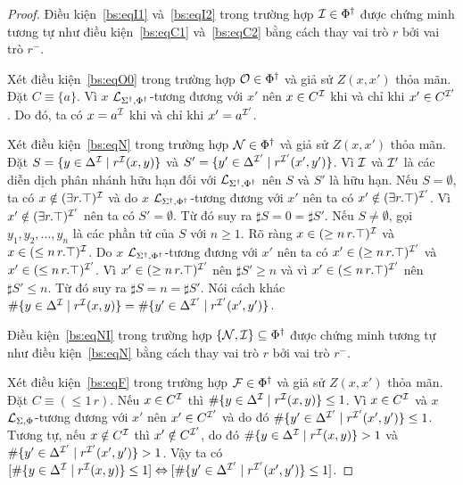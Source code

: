 \begin{proof}
	\semiItem Điều kiện~\eqref{bs:eqI1} và~\eqref{bs:eqI2} trong trường hợp $\mathcal{I} \in \Phi^\dag$ được chứng minh tương tự như điều kiện~\eqref{bs:eqC1} và~\eqref{bs:eqC2} bằng cách thay vai trò $r$ bởi vai trò $r^-$.
	
	\semiItem Xét điều kiện~\eqref{bs:eqO0} trong trường hợp $\mathcal{O} \in \Phi^\dag$ và giả sử $Z(x,x')$ thỏa mãn. Đặt $C \equiv \{a\}$. Vì $x$ $\mathcal{L}_{\Sigma^\dag,\Phi^\dag}$-tương đương với $x'$ nên $x \in C^{\mathcal{I}}$ khi và chỉ khi $x' \in C^{\mathcal{I}'}$. Do đó, ta có $x = a^{\mathcal{I}}$ khi và chỉ khi $x' = a^{\mathcal{I}'}$.
	
	\semiItem Xét điều kiện~\eqref{bs:eqN} trong trường hợp $\mathcal{N} \in \Phi^\dag$ và giả sử $Z(x,x')$ thỏa mãn. Đặt $S = \{y \in \Delta^{\mathcal{I}} \mid r^{\mathcal{I}}(x,y)\}$ và $S' = \{y' \in \Delta^{\mathcal{I}'} \mid r^{\mathcal{I}'}(x',y')\}$. Vì $\mathcal{I}$ và $\mathcal{I}'$ là các diễn dịch phân nhánh hữu hạn đối với $\mathcal{L}_{\Sigma^\dag,\Phi^\dag}$ nên $S$ và $S'$ là hữu hạn. Nếu $S=\emptyset$, ta có $x \notin (\exists r.\top)^{\mathcal{I}}$ và do $x$ $\mathcal{L}_{\Sigma^\dag,\Phi^\dag}$-tương đương với $x'$ nên ta có $x' \notin (\exists r.\top)^{\mathcal{I}'}$. Vì $x' \notin (\exists r.\top)^{\mathcal{I}'}$ nên ta có $S' = \emptyset$. Từ đó suy ra $\sharp S = 0 = \sharp S'$. Nếu $S \not= \emptyset$, gọi $y_1, y_2, \ldots, y_n$ là các phần tử của $S$ với $n \geq 1$. Rõ ràng $x \in (\geq n\,r.\top)^{\mathcal{I}}$ và $x \in (\leq n\,r.\top)^{\mathcal{I}}$. Do $x$ $\mathcal{L}_{\Sigma^\dag,\Phi^\dag}$-tương đương với $x'$ nên ta có $x' \in (\geq n\,r.\top)^{\mathcal{I}'}$ và $x' \in (\leq n\,r.\top)^{\mathcal{I}'}$. Vì $x' \in (\geq n\,r.\top)^{\mathcal{I}'}$ nên $\sharp S' \geq n$ và vì $x' \in (\leq n\,r.\top)^{\mathcal{I}'}$ nên $\sharp S' \leq n$. Từ đó suy ra $\sharp S = n = \sharp S'$. Nói cách khác $\#\{y \in \Delta^{\mathcal{I}} \mid r^{\mathcal{I}}(x,y)\} = \#\{y' \in \Delta^{\mathcal{I}'} \mid r^{\mathcal{I}'}(x',y')\}$.
	
	\semiItem Điều kiện~\eqref{bs:eqNI} trong trường hợp $\{\mathcal{N},\mathcal{I}\} \subseteq \Phi^\dag$ được chứng minh tương tự như điều kiện~\eqref{bs:eqN} bằng cách thay vai trò $r$ bởi vai trò $r^-$.
	
	\semiItem Xét điều kiện~\eqref{bs:eqF} trong trường hợp $\mathcal{F} \in \Phi^\dag$ và giả sử $Z(x,x')$ thỏa mãn. Đặt $C \equiv (\leq\!1\,r)$. Nếu $x \in C^{\mathcal{I}}$ thì $\#\{y \in \Delta^{\mathcal{I}} \mid r^{\mathcal{I}}(x,y)\} \leq 1$. Vì $x \in C^{\mathcal{I}}$ và $x$ $\mathcal{L}_{\Sigma,\Phi}$-tương đương với $x'$ nên $x' \in C^{\mathcal{I}'}$ và do đó $\#\{y' \in \Delta^{\mathcal{I}'} \mid r^{\mathcal{I}'}(x',y')\} \leq 1$. Tương tự, nếu $x \notin C^{\mathcal{I}}$ thì $x' \notin C^{\mathcal{I}'}$, do đó $\#\{y \in \Delta^{\mathcal{I}} \mid r^{\mathcal{I}}(x,y)\} > 1$ và $\#\{y' \in \Delta^{\mathcal{I}'} \mid r^{\mathcal{I}'}(x',y')\} > 1$. Vậy ta có $[\#\{y \in \Delta^{\mathcal{I}} \mid r^{\mathcal{I}}(x,y)\} \leq 1] \Leftrightarrow [\#\{y' \in \Delta^{\mathcal{I}'} \mid r^{\mathcal{I}'}(x',y')\} \leq 1]$.
	

\end{proof}
